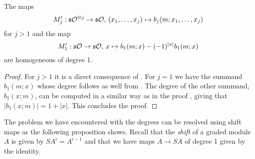 \documentclass[Thesis.tex]{subfiles}
\begin{document}
\begin{corollary}
The maps 
\begin{equation*}
M_j':\mathfrak{s}{\mathcal O}^{\otimes j}\to \mathfrak{s}{\mathcal O},\, (x_1,\dots, x_j)\mapsto b_j(m;x_1,\dots, x_j)
\end{equation*}
for $j>1$ and the map
\begin{equation*}
M_1':\mathfrak{s}{\mathcal O}\to \mathfrak{s}{\mathcal O},\, x\mapsto b_1(m;x)-(-1)^{|x|}b_1(m;x)
\end{equation*}
are homogeneous of degree 1. 
\end{corollary}
\begin{proof}
For $j>1$ it is a direct consequence of . For $j=1$ we have the summand $b_1(m;x)$ whose degree follows as well from . The degree of the other summand, $b_1(x;m)$, can be computed in a similar way as in the proof , giving that $|b_1(x;m)|=1+|x|$. This concludes the proof.
\end{proof}

The problem we have encountered with the degrees can be resolved using shift maps as the following proposition shows. Recall that the \emph{shift} of a graded module $A$ is given by $SA^i=A^{i-1}$ and that we have maps $A\to SA$ of degree 1 given by the identity. 
\end{document}
